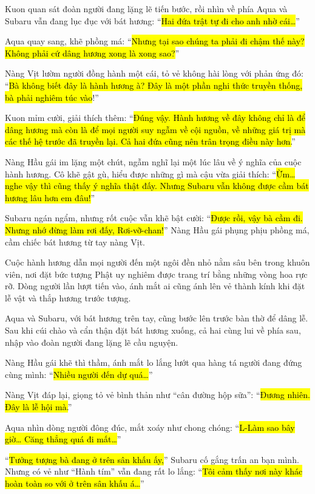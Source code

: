 \documentclass[../main.tex]{subfiles}
\begin{document}
Kuon quan sát đoàn người đang lặng lẽ tiến bước, rồi nhìn về phía Aqua và Subaru vẫn đang lục đục với bát hương: ``\hl{Hai đứa trật tự đi cho anh nhờ cái\dots}''

Aqua quay sang, khẽ phồng má: ``\hl{Nhưng tại sao chúng ta phải đi chậm thế này? Không phải cứ dâng hương xong là xong sao?}''

Nàng Vịt lườm người đồng hành một cái, tỏ vẻ không hài lòng với phản ứng đó: ``\hl{Bà không biết đây là hành hương à? Đây là một phần nghi thức truyền thống, bà phải nghiêm túc vào}!''

Kuon mỉm cười, giải thích thêm: ``\hl{Đúng vậy. Hành hương về đây không chỉ là để dâng hương mà còn là để mọi người suy ngẫm về cội nguồn, về những giá trị mà các thế hệ trước đã truyền lại. Cả hai đứa cũng nên trân trọng điều này hơn.}''

Nàng Hầu gái im lặng một chút, ngẫm nghĩ lại một lúc lâu về ý nghĩa của cuộc hành hương. Cô khẽ gật gù, hiểu được những gì mà cậu vừa giải thích: ``\hl{Ừm\dots{} nghe vậy thì cũng thấy ý nghĩa thật đấy. Nhưng Subaru vẫn không được cầm bát hương lâu hơn em đâu!}''

Subaru ngán ngẩm, nhưng rốt cuộc vẫn khẽ bật cười: ``\hl{Được rồi, vậy bà cầm đi. Nhưng nhớ đừng làm rơi đấy, Rơi-vỡ-chan!}'' Nàng Hầu gái phụng phịu phồng má, cầm chiếc bát hương từ tay nàng Vịt.

\ct

Cuộc hành hương dẫn mọi người đến một ngôi đền nhỏ nằm sâu bên trong khuôn viên, nơi đặt bức tượng Phật uy nghiêm được trang trí bằng những vòng hoa rực rỡ. Dòng người lần lượt tiến vào, ánh mắt ai cũng ánh lên vẻ thành kính khi đặt lễ vật và thắp hương trước tượng.

Aqua và Subaru, với bát hương trên tay, cũng bước lên trước bàn thờ để dâng lễ. Sau khi cúi chào và cẩn thận đặt bát hương xuống, cả hai cùng lui về phía sau, nhập vào đoàn người đang lặng lẽ cầu nguyện.

Nàng Hầu gái khẽ thì thầm, ánh mắt lo lắng lướt qua hàng tá người đang đứng cùng mình: ``\hl{Nhiều người đến dự quá\dots}''

Nàng Vịt đáp lại, giọng tỏ vẻ bình thản như ``cân đường hộp sữa'': ``\hl{Đương nhiên. Đây là lễ hội mà.}''

Aqua nhìn dòng người đông đúc, mắt xoáy như chong chóng: ``\hl{L-Làm sao bây giờ\dots{} Căng thẳng quá đi mất\dots}''

``\hl{Tưởng tượng bà đang ở trên sân khấu ấy,}'' Subaru cố gắng trấn an bạn mình. Nhưng có vẻ như ``Hành tím'' vẫn đang rất lo lắng: ``\hl{Tôi cảm thấy nơi này khác hoàn toàn so với ở trên sân khấu á\dots}''
\end{document}
